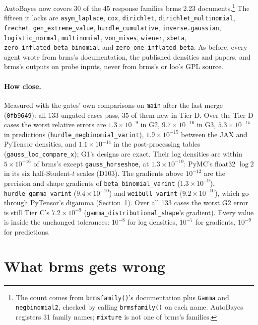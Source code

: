 \documentclass[11pt]{article}
\newcommand{\code}[1]{\texttt{#1}}
\begin{document}
\noindent AutoBayes now covers 30 of the 45 response families brms 2.23 documents.\footnote{The count comes from
\code{brmsfamily()}'s documentation plus \code{Gamma} and \code{negbinomial2}, checked by calling \code{brmsfamily()} on
each name. AutoBayes registers 31 family names; \code{mixture} is not one of brms's families.} The fifteen it lacks are
\code{asym\_laplace}, \code{cox}, \code{dirichlet}, \code{dirichlet\_multinomial}, \code{frechet},
\code{gen\_extreme\_value}, \code{hurdle\_cumulative}, \code{inverse.gaussian}, \code{logistic\_normal},
\code{multinomial}, \code{von\_mises}, \code{wiener}, \code{xbeta}, \code{zero\_inflated\_beta\_binomial} and
\code{zero\_one\_inflated\_beta}. As before, every agent wrote from brms's documentation, the published densities and
papers, and brms's outputs on probe inputs, never from brms's or loo's GPL source.

\paragraph{How close.} Measured with the gates' own comparisons on \code{main} after the last merge (\code{0fb9649}): all 133 ungated
cases pass, 35 of them new in Tier D. Over the Tier D cases the worst relative errors are $1.3\times10^{-9}$ in G2,
$9.7\times10^{-16}$ in G3, $5.3\times10^{-15}$ in predictions (\code{hurdle\_negbinomial\_varint}), $1.9\times10^{-15}$
between the JAX and PyTensor densities, and $1.1\times10^{-14}$ in the post-processing tables
(\code{gauss\_loo\_compare\_x}); G1's designs are exact. Their log densities are within $5\times10^{-16}$ of brms's except
\code{gauss\_horseshoe}, at $1.3\times10^{-10}$: PyMC's float32 $\log 2$ in its six half-Student-$t$ scales (D103). The
gradients above $10^{-12}$ are the precision and shape gradients of \code{beta\_binomial\_varint} ($1.3\times10^{-9}$),
\code{hurdle\_gamma\_varint} ($9.4\times10^{-10}$) and \code{weibull\_varint} ($9.2\times10^{-10}$), which go through
PyTensor's digamma (Section~\ref{sec:brms}). Over all 133 cases the worst G2 error is still Tier C's
$7.2\times10^{-9}$ (\code{gamma\_distributional\_shape}'s gradient). Every value is inside the unchanged tolerances:
$10^{-8}$ for log densities, $10^{-7}$ for gradients, $10^{-9}$ for predictions.

\section{What brms gets wrong}
\label{sec:brms}
\end{document}
